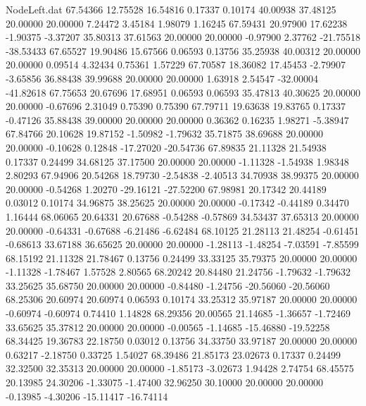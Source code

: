 \begin{filecontents}{NodeLeft.dat}
  67.54366   12.75528   16.54816     0.17337    0.10174   40.00938   37.48125   20.00000   20.00000    7.24472    3.45184    1.98079    1.16245
  67.59431   20.97900   17.62238    -1.90375   -3.37207   35.80313   37.61563   20.00000   20.00000   -0.97900    2.37762  -21.75518  -38.53433
  67.65527   19.90486   15.67566     0.06593    0.13756   35.25938   40.00312   20.00000   20.00000    0.09514    4.32434    0.75361    1.57229
  67.70587   18.36082   17.45453    -2.79907   -3.65856   36.88438   39.99688   20.00000   20.00000    1.63918    2.54547  -32.00004  -41.82618
  67.75653   20.67696   17.68951     0.06593    0.06593   35.47813   40.30625   20.00000   20.00000   -0.67696    2.31049    0.75390    0.75390
  67.79711   19.63638   19.83765     0.17337   -0.47126   35.88438   39.00000   20.00000   20.00000    0.36362    0.16235    1.98271   -5.38947
  67.84766   20.10628   19.87152    -1.50982   -1.79632   35.71875   38.69688   20.00000   20.00000   -0.10628    0.12848  -17.27020  -20.54736
  67.89835   21.11328   21.54938     0.17337    0.24499   34.68125   37.17500   20.00000   20.00000   -1.11328   -1.54938    1.98348    2.80293
  67.94906   20.54268   18.79730    -2.54838   -2.40513   34.70938   38.99375   20.00000   20.00000   -0.54268    1.20270  -29.16121  -27.52200
  67.98981   20.17342   20.44189     0.03012    0.10174   34.96875   38.25625   20.00000   20.00000   -0.17342   -0.44189    0.34470    1.16444
  68.06065   20.64331   20.67688    -0.54288   -0.57869   34.53437   37.65313   20.00000   20.00000   -0.64331   -0.67688   -6.21486   -6.62484
  68.10125   21.28113   21.48254    -0.61451   -0.68613   33.67188   36.65625   20.00000   20.00000   -1.28113   -1.48254   -7.03591   -7.85599
  68.15192   21.11328   21.78467     0.13756    0.24499   33.33125   35.79375   20.00000   20.00000   -1.11328   -1.78467    1.57528    2.80565
  68.20242   20.84480   21.24756    -1.79632   -1.79632   33.25625   35.68750   20.00000   20.00000   -0.84480   -1.24756  -20.56060  -20.56060
  68.25306   20.60974   20.60974     0.06593    0.10174   33.25312   35.97187   20.00000   20.00000   -0.60974   -0.60974    0.74410    1.14828
  68.29356   20.00565   21.14685    -1.36657   -1.72469   33.65625   35.37812   20.00000   20.00000   -0.00565   -1.14685  -15.46880  -19.52258
  68.34425   19.36783   22.18750     0.03012    0.13756   34.33750   33.97187   20.00000   20.00000    0.63217   -2.18750    0.33725    1.54027
  68.39486   21.85173   23.02673     0.17337    0.24499   32.32500   32.35313   20.00000   20.00000   -1.85173   -3.02673    1.94428    2.74754
  68.45575   20.13985   24.30206    -1.33075   -1.47400   32.96250   30.10000   20.00000   20.00000   -0.13985   -4.30206  -15.11417  -16.74114

\end{filecontents}
